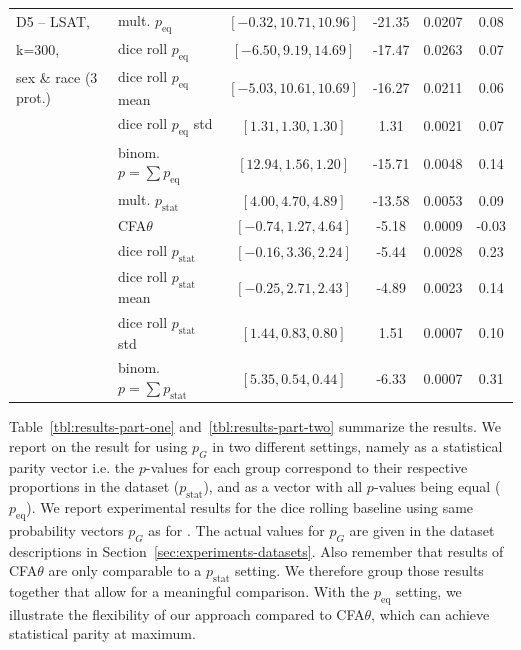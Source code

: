\begin{table}[t!]
{\begin{tabular}{llcccc}
		\midrule
		\midrule
		D5 -- LSAT, 			& mult. \algoFAIR $p_{\text{eq}}$ 	& $[-0.32, 10.71, 10.96]$ 	& -21.35 	& 0.0207 	& 0.08 \\
		k=300, 					& dice roll $p_{\text{eq}}$		& $[-6.50, 9.19, 14.69]$	& -17.47	& 0.0263 	& 0.07\\
		sex \& race (3 prot.)	& dice roll $p_{\text{eq}}$ mean	& $[-5.03, 10.61, 10.69]$		& -16.27		& 0.0211 	& 0.06 \\
								& dice roll $p_{\text{eq}}$	std & $[1.31, 1.30, 1.30]$		& 1.31		& 0.0021 	& 0.07 \\
								& binom. \algoFAIR $p = \sum p_{\text{eq}}$	& $[12.94,1.56, 1.20]$		& -15.71		& 0.0048 	& 0.14 \\
								\cline{2-6}
			& mult. \algoFAIR $p_{\text{stat}}$ 	& $[4.00, 4.70, 4.89]$ 		& -13.58 	& 0.0053	& 0.09 \\
							 	& CFA$\theta$ 					& $[-0.74, 1.27, 4.64]$ 	& -5.18		& 0.0009 	& -0.03 \\
								& dice roll $p_{\text{stat}}$	& $[-0.16, 3.36, 2.24]$		& -5.44		& 0.0028 	& 0.23 \\
								& dice roll $p_{\text{stat}}$ mean	& $[-0.25, 2.71, 2.43]$		& -4.89		& 0.0023 	& 0.14 \\
								& dice roll $p_{\text{stat}}$	std & $[1.44, 0.83, 0.80]$		& 1.51		& 0.0007 	& 0.10 \\
								& binom. \algoFAIR $p = \sum p_{\text{stat}}$	& $[5.35,0.54, 0.44]$		& -6.33		& 0.0007 	& 0.31 \\													
		\bottomrule
	\end{tabular}
	}
\end{table}
%
Table~\ref{tbl:results-part-one} and~\ref{tbl:results-part-two} summarize the results.
%
We report on the result for \algoFAIR using $p_G$ in two different settings, namely as a statistical parity vector i.e. the $p$-values for each group correspond to their respective proportions in the dataset ($p_{\text{stat}}$), and as a vector with all $p$-values being equal ($p_{\text{eq}}$).
%
We report experimental results for the dice rolling baseline using same probability vectors $p_G$ as for \algoFAIR.
%
The actual values for $p_G$ are given in the dataset descriptions in Section~\ref{sec:experiments-datasets}.
%
Also remember that results of CFA$\theta$ are only comparable to a \algoFAIR $p_{\text{stat}}$ setting.
%
We therefore group those results together that allow for a meaningful comparison.
%
With the $p_{\text{eq}}$ setting, we illustrate the flexibility of our approach compared to CFA$\theta$, which can achieve statistical parity at maximum.

